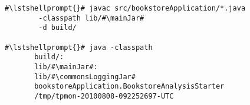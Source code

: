 \begin{lstlisting}[caption=Compile and run under Linux,label=lst:bookstoreAnalysisStarterLinux] 			
#\lstshellprompt{}# javac src/bookstoreApplication/*.java
        -classpath lib/#\mainJar#
        -d build/

#\lstshellprompt{}# java -classpath
       build/:
       lib/#\mainJar#:
       lib/#\commonsLoggingJar#
       bookstoreApplication.BookstoreAnalysisStarter 
       /tmp/tpmon-20100808-092252697-UTC
\end{lstlisting}	
